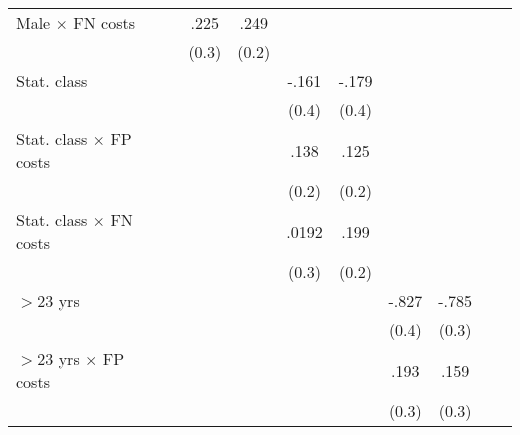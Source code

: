 \begin{table}[htbp]
\begin{tabular}{l*{9}{c}}
Male $\times$ FN costs&                  &     .225         &     .249         &                  &                  &                  &                  &                  &                  \\
                &                  &    (0.3)         &    (0.2)         &                  &                  &                  &                  &                  &                  \\
Stat. class     &                  &                  &                  &    -.161         &    -.179         &                  &                  &                  &                  \\
                &                  &                  &                  &    (0.4)         &    (0.4)         &                  &                  &                  &                  \\
Stat. class $\times$ FP costs&                  &                  &                  &     .138         &     .125         &                  &                  &                  &                  \\
                &                  &                  &                  &    (0.2)         &    (0.2)         &                  &                  &                  &                  \\
Stat. class $\times$ FN costs&                  &                  &                  &    .0192         &     .199         &                  &                  &                  &                  \\
                &                  &                  &                  &    (0.3)         &    (0.2)         &                  &                  &                  &                  \\
$>$23 yrs       &                  &                  &                  &                  &                  &    -.827\sym{**} &    -.785\sym{**} &                  &                  \\
                &                  &                  &                  &                  &                  &    (0.4)         &    (0.3)         &                  &                  \\
$>$23 yrs $\times$ FP costs&                  &                  &                  &                  &                  &     .193         &     .159         &                  &                  \\
                &                  &                  &                  &                  &                  &    (0.3)         &    (0.3)         &                  &                  \\

\end{tabular}
\end{table}
